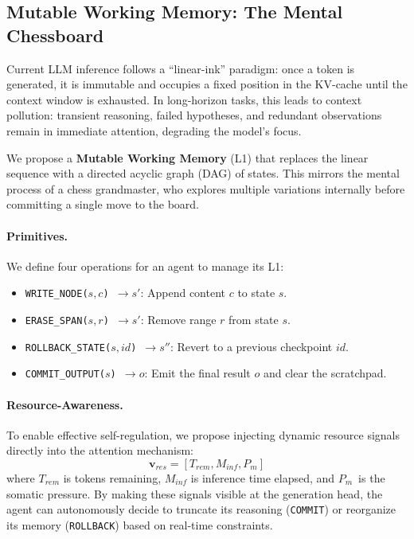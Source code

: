 \documentclass[11pt,a4paper]{article}
\newcommand{\Pm}{\ensuremath{P_m}}
\begin{document}
\subsection{Mutable Working Memory: The Mental Chessboard}

Current LLM inference follows a ``linear-ink'' paradigm: once a token
is generated, it is immutable and occupies a fixed position in the
KV-cache until the context window is exhausted.
In long-horizon tasks, this leads to context pollution: transient
reasoning, failed hypotheses, and redundant observations remain in
immediate attention, degrading the model's focus.

We propose a \textbf{Mutable Working Memory} (L1) that replaces the
linear sequence with a directed acyclic graph (DAG) of states.
This mirrors the mental process of a chess grandmaster, who explores
multiple variations internally before committing a single move to the
board.

\paragraph{Primitives.}
We define four operations for an agent to manage its L1:
\begin{itemize}[leftmargin=*]
  \item \texttt{WRITE\_NODE($s, c$) $\to s'$}: Append content $c$ to state $s$.
  \item \texttt{ERASE\_SPAN($s, r$) $\to s'$}: Remove range $r$ from state $s$.
  \item \texttt{ROLLBACK\_STATE($s, id$) $\to s''$}: Revert to a previous
        checkpoint $id$.
  \item \texttt{COMMIT\_OUTPUT($s$) $\to o$}: Emit the final result $o$ and
        clear the scratchpad.
\end{itemize}

\paragraph{Resource-Awareness.}
To enable effective self-regulation, we propose injecting dynamic
resource signals directly into the attention mechanism:
\begin{equation}
  \mathbf{v}_{res} = [T_{rem}, M_{inf}, \Pm]
\end{equation}
where $T_{rem}$ is tokens remaining, $M_{inf}$ is inference time elapsed,
and \Pm\ is the somatic pressure.
By making these signals visible at the generation head, the agent can
autonomously decide to truncate its reasoning (\texttt{COMMIT}) or
reorganize its memory (\texttt{ROLLBACK}) based on real-time constraints.
\end{document}
